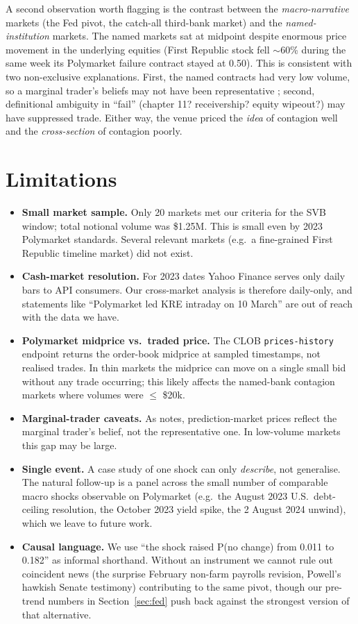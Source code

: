 \documentclass{article}
\begin{document}
A second observation worth flagging is the contrast between the
\emph{macro-narrative} markets (the Fed pivot, the catch-all third-bank
market) and the \emph{named-institution} markets.  The named markets
sat at midpoint despite enormous price movement in the underlying
equities (First Republic stock fell $\sim$60\% during the same week
its Polymarket failure contract stayed at 0.50).  This is consistent
with two non-exclusive explanations.  First, the named contracts had
very low volume, so a marginal trader's beliefs may not have been
representative \citep{manski_2006}; second, definitional ambiguity in
``fail'' (chapter 11? receivership? equity wipeout?) may have suppressed
trade.  Either way, the venue priced the \emph{idea} of contagion well
and the \emph{cross-section} of contagion poorly.

\section{Limitations}
\label{sec:limits}

\begin{itemize}
\item \textbf{Small market sample.} Only 20 markets met our criteria for
the SVB window; total notional volume was \$1.25M.  This is small even
by 2023 Polymarket standards.  Several relevant markets (e.g.\ a fine-grained
First Republic timeline market) did not exist.
\item \textbf{Cash-market resolution.} For 2023 dates Yahoo Finance
serves only daily bars to API consumers.  Our cross-market analysis
is therefore daily-only, and statements like ``Polymarket led KRE
intraday on 10 March'' are out of reach with the data we have.
\item \textbf{Polymarket midprice vs.\ traded price.} The CLOB
\texttt{prices-history} endpoint returns the order-book midprice at
sampled timestamps, not realised trades.  In thin markets the midprice
can move on a single small bid without any trade occurring; this likely
affects the named-bank contagion markets where volumes were $\leq$
\$20k.
\item \textbf{Marginal-trader caveats.} As \citet{manski_2006} notes,
prediction-market prices reflect the marginal trader's belief, not the
representative one.  In low-volume markets this gap may be large.
\item \textbf{Single event.} A case study of one shock can only
\emph{describe}, not generalise.  The natural follow-up is a panel
across the small number of comparable macro shocks observable on
Polymarket (e.g.\ the August 2023 U.S.\ debt-ceiling resolution, the
October 2023 yield spike, the 2 August 2024 unwind), which we leave to
future work.
\item \textbf{Causal language.} We use ``the shock raised P(no change)
from 0.011 to 0.182'' as informal shorthand.  Without an instrument we
cannot rule out coincident news (the surprise February non-farm payrolls
revision, Powell's hawkish Senate testimony) contributing to the same
pivot, though our pre-trend numbers in Section~\ref{sec:fed} push back
against the strongest version of that alternative.
\end{itemize}
\end{document}
